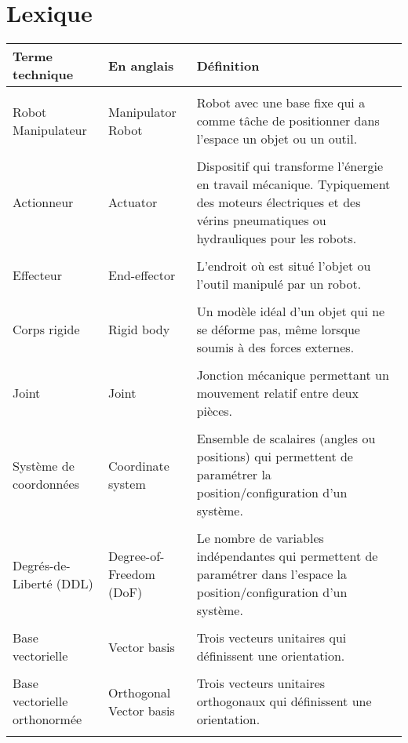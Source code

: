 ﻿\newpage

\section{Lexique}

\begin{center}
	\begin{tabular}{  p{3.5cm} p{3.5cm} p{7cm} }
		\hline
		\textbf{Terme technique} & \textbf{En anglais} & \textbf{Définition} \\ \hline\hline \\
		Robot Manipulateur &  Manipulator Robot &
		Robot avec une base fixe qui a comme tâche de positionner dans l'espace un objet ou un outil.
		\\  &  \\
		Actionneur &  Actuator &
		Dispositif qui transforme l'énergie en travail mécanique. Typiquement des moteurs électriques et des vérins pneumatiques ou hydrauliques pour les robots.
		\\  &  \\
		Effecteur  & End-effector &
		L'endroit où est situé l'objet ou l'outil manipulé par un robot.
		\\   &  \\
		Corps rigide & Rigid body &
		Un modèle idéal d'un objet qui ne se déforme pas, même lorsque soumis à des forces externes.
		\\   &  \\
		Joint & Joint &
		Jonction mécanique permettant un mouvement relatif entre deux pièces.
		\\  &  \\
		Système de coordonnées &  Coordinate system &
		Ensemble de scalaires (angles ou positions) qui permettent de paramétrer la position/configuration d'un système.
		\\  &  \\
		Degrés-de-Liberté (DDL) & Degree-of-Freedom (DoF) &
		Le nombre de variables indépendantes qui permettent de paramétrer dans l'espace la position/configuration d'un système.
		\\  &  \\
		Base vectorielle  & Vector basis &
		Trois vecteurs unitaires qui définissent une orientation.
		\\  &  \\
		Base vectorielle orthonormée & Orthogonal Vector basis &
		Trois vecteurs unitaires orthogonaux qui définissent une orientation.
		\\  &  \\

\end{tabular}
\end{center}
